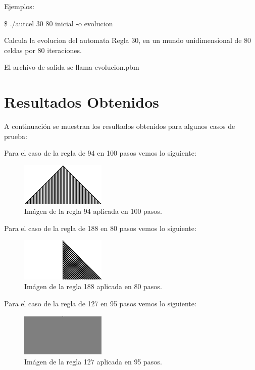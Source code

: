 \documentclass[9pt,a4paper]{article}
\begin{document}
Ejemplos: 
\par
{\ttfamily\footnotesize
\$ ./autcel 30 80 inicial -o evolucion}
\par
Calcula la evolucion del automata Regla 30, en un mundo unidimensional de 80 celdas por 80 iteraciones.
\par
El archivo de salida se llama evolucion.pbm
\bigskip

\section{Resultados Obtenidos}

A continuación se muestran los resultados obtenidos para algunos casos de prueba:
\par

Para el caso de la regla de 94 en 100 pasos vemos lo siguiente:
\medskip

\begin{figure}[H]
	\centering
	\includegraphics[width=0.36\textwidth]{./imgs/regla 94 de 100x100.png}
	\medskip
	\caption{Imágen de la regla 94 aplicada en 100 pasos.}
\end{figure}
\medskip


Para el caso de la regla de 188 en 80 pasos vemos lo siguiente:
\medskip

\begin{figure}[H]
	\centering
	\includegraphics[width=0.36\textwidth]{./imgs/Regla 188 de 80x80.png}
	\medskip
	\caption{Imágen de la regla 188 aplicada en 80 pasos.}
\end{figure}
\medskip


Para el caso de la regla de 127 en 95 pasos vemos lo siguiente:
\medskip

\begin{figure}[H]
	\centering
	\includegraphics[width=0.36\textwidth]{./imgs/Regla 127 de 95x95.png}
	\medskip
	\caption{Imágen de la regla 127 aplicada en 95 pasos.}
\end{figure}
\medskip
\end{document}
